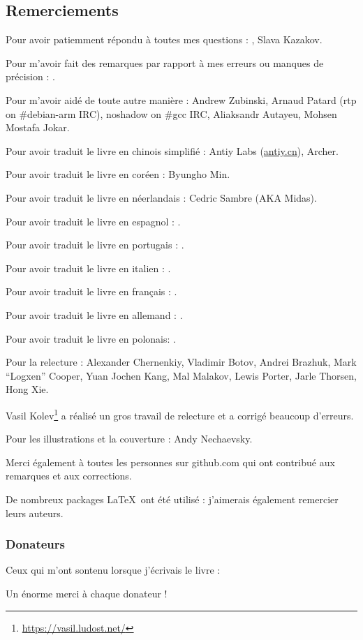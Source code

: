 \subsection*{Remerciements}

Pour avoir patiemment répondu à toutes mes questions : \HERMIT, Slava  Kazakov.

Pour m'avoir fait des remarques par rapport à mes erreurs ou manques de précision : \PeopleMistakesInaccuracies{}.

Pour m'avoir aidé de toute autre manière :
Andrew Zubinski,
Arnaud Patard (rtp on \#debian-arm IRC),
noshadow on \#gcc IRC,
Aliaksandr Autayeu,
Mohsen Mostafa Jokar.

Pour avoir traduit le livre en chinois simplifié :
Antiy Labs (\href{http://antiy.cn}{antiy.cn}), Archer.

Pour avoir traduit le livre en coréen : Byungho Min.

Pour avoir traduit le livre en néerlandais : Cedric Sambre (AKA Midas).

Pour avoir traduit le livre en espagnol : \PeopleSpanishTranslators{}.

Pour avoir traduit le livre en portugais : \PeoplePTBRTranslators{}.

Pour avoir traduit le livre en italien : \PeopleItalianTranslators{}.

Pour avoir traduit le livre en français : \PeopleFrenchTranslators{}.

Pour avoir traduit le livre en allemand : \PeopleGermanTranslators{}.

Pour avoir traduit le livre en polonais: \PeoplePolishTranslators{}.

Pour la relecture :
Alexander  Chernenkiy,
Vladimir Botov,
Andrei Brazhuk,
Mark ``Logxen'' Cooper, Yuan Jochen Kang, Mal Malakov, Lewis Porter, Jarle Thorsen, Hong Xie.

Vasil Kolev\footnote{\url{https://vasil.ludost.net/}} a réalisé un gros travail de relecture et a corrigé beaucoup d'erreurs.

Pour les illustrations et la couverture : Andy Nechaevsky.

Merci également à toutes les personnes sur github.com qui ont contribué aux remarques et aux corrections\FNGithubContributors{}.

De nombreux packages \LaTeX\ ont été utilisé : j'aimerais également remercier leurs auteurs.

\subsubsection*{Donateurs}

Ceux qui m'ont sontenu lorsque j'écrivais le livre :



Un énorme merci à chaque donateur !
